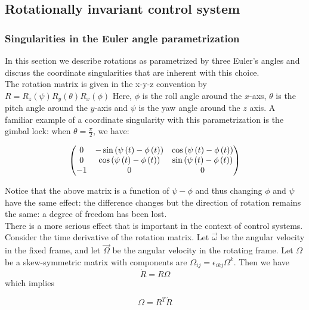 \documentclass[aps, prd, amsmath, floats, floatfix, twocolumn,superscriptaddress, nofootinbib, showpacs]{revtex4-1}
\theoremstyle{plain}
\theoremstyle{definition}
\newcommand{\sergei}[1]{\textcolor{RubineRed}{#1}}
\begin{document}
\subsection{\sergei{Rotationally invariant control system}}

\subsubsection{\sergei{Singularities in the Euler angle parametrization}}

In this section we describe rotations as parametrized by three Euler's angles and
discuss the coordinate singularities that are  inherent with this choice. \\

The rotation matrix is given in the x-y-z convention by 
$R=R_z(\psi)R_y(\theta)R_x(\phi)$
Here, $\phi$ is the roll angle around the $x$-axs, $\theta$ is the pitch angle
around the $y$-axis and $\psi$ is the yaw angle around the $z$ axis. A 
familiar example of a coordinate singularity with this parametrization
is the gimbal lock: when $\theta=\frac{\pi}{2}$, we have:

\[\begin{pmatrix}

0&-\sin \left({\psi}\left(t\right)-{\phi}\left(t 
\right)\right)&\cos \left({\psi}\left(t\right)-{\phi}\left(t 
\right)\right)\cr 0&\cos \left({\psi}\left(t\right)-{\phi} 
\left(t\right)\right)&\sin \left({\psi}\left(t\right)-{\phi} 
\left(t\right)\right)\cr -1&0&0\cr 

\end{pmatrix}\]

Notice that the above matrix is a function of $\psi-\phi$ and thus changing 
$\phi$ and $\psi$ have the same effect: the difference changes but the 
direction of rotation remains the same: a degree of freedom has been 
lost.  \\

There is a more serious effect that is important in the context of control
systems. Consider the time derivative of the rotation matrix. Let 
$\vec{\omega}$ be the angular velocity in the fixed frame, and let
$\vec{\Omega}$ be the angular velocity in the rotating frame. Let 
$\Omega  $ be a skew-symmetric matrix with components are 
$\Omega_{ij}=\epsilon_{ikj}\Omega^{k}$. Then we have
\[\dot{R} = R\Omega \]
which implies  

\begin{equation}
\Omega = R^{T}\dot{R}
\end{equation}
\end{document}
